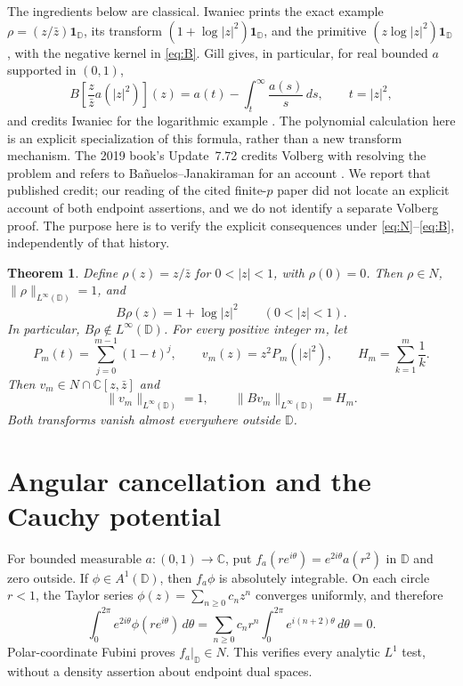 \documentclass[10pt]{article}
\newtheorem{theorem}{Theorem}
\newcommand{\C}{\mathbb C}
\newcommand{\D}{\mathbb D}
\newcommand{\ind}{\mathbf 1}
\begin{document}
The ingredients below are classical. Iwaniec \cite[p.~388, (6)--(7)]{I86}
prints the exact example $\rho=(z/\bar z)\ind_{\D}$, its transform
$(1+\log|z|^2)\ind_{\D}$, and the primitive
$(z\log|z|^2)\ind_{\D}$, with the negative kernel in \eqref{eq:B}.
Gill \cite[p.~354, Theorem~1]{G10} gives, in particular, for real
bounded $a$ supported in $(0,1)$,
\begin{equation}\label{eq:Gill}
 B\left[\frac z{\bar z}a(|z|^2)\right](z)
     =a(t)-\int_t^\infty\frac{a(s)}s\,ds,\qquad t=|z|^2,
\end{equation}
and credits Iwaniec for the logarithmic example
\cite[pp.~355--356]{G10}. The polynomial calculation here is an explicit
specialization of this formula, rather than a new transform mechanism.
The 2019 book's Update~7.72 credits Volberg with resolving the problem and
refers to Ba\~nuelos--Janakiraman \cite{BJ08} for an account
\cite[p.~211]{HL19}. We report that published credit; our reading of
the cited finite-$p$ paper did not locate an explicit account of both
endpoint assertions, and we do not identify a separate Volberg proof.
The purpose here is to verify the explicit
consequences under \eqref{eq:N}--\eqref{eq:B}, independently of that history.

\begin{theorem}\label{thm:main}
Define $\rho(z)=z/\bar z$ for $0<|z|<1$, with $\rho(0)=0$.
Then $\rho\in N$, $\|\rho\|_{L^\infty(\D)}=1$, and
\begin{equation}\label{eq:rho}
 B\rho(z)=1+\log|z|^2\qquad(0<|z|<1).
\end{equation}
In particular, $B\rho\notin L^\infty(\D)$.
For every positive integer $m$, let
\begin{equation}\label{eq:vm}
 P_m(t)=\sum_{j=0}^{m-1}(1-t)^j,\qquad
 v_m(z)=z^2P_m(|z|^2),\qquad H_m=\sum_{k=1}^m\frac1k.
\end{equation}
Then $v_m\in N\cap\C[z,\bar z]$ and
\begin{equation}\label{eq:norms}
 \|v_m\|_{L^\infty(\D)}=1,\qquad
 \|Bv_m\|_{L^\infty(\D)}=H_m.
\end{equation}
Both transforms vanish almost everywhere outside $\D$.
\end{theorem}

\section{Angular cancellation and the Cauchy potential}
For bounded measurable $a:(0,1)\to\C$, put
$f_a(re^{i\theta})=e^{2i\theta}a(r^2)$ in $\D$ and zero outside.
If $\phi\in A^1(\D)$, then $f_a\phi$ is absolutely integrable.
On each circle $r<1$, the Taylor series $\phi(z)=\sum_{n\ge0}c_nz^n$
converges uniformly, and therefore
\[
 \int_0^{2\pi}e^{2i\theta}\phi(re^{i\theta})\,d\theta
  =\sum_{n\ge0}c_nr^n\int_0^{2\pi}e^{i(n+2)\theta}\,d\theta=0.
\]
Polar-coordinate Fubini proves $f_a|_{\D}\in N$. This verifies every
analytic $L^1$ test, without a density assertion about endpoint dual spaces.
\end{document}
